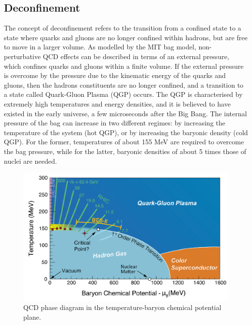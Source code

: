 \subsection{Deconfinement}
The concept of deconfinement refers to the transition from a confined state to a state where quarks and gluons are no longer confined within hadrons, but are free to move in a larger volume. As modelled by the MIT bag model, non-perturbative QCD effects can be described in terms of an external pressure, which confines quarks and gluons within a finite volume. If the external pressure is overcome by the pressure due to the kinematic energy of the quarks and gluons, then the hadrons constituents are no longer confined, and a transition to a state called Quark-Gluon Plasma (QGP) occurs. The QGP is characterised by extremely high temperatures and energy densities, and it is believed to have existed in the early universe, a few microseconds after the Big Bang. The internal pressure of the bag can increase in two different regimes: by increasing the temperature of the system (hot QGP), or by increasing the baryonic density (cold QGP). For the former, temperatures of about 155 MeV are required to overcome the bag pressure, while for the latter, baryonic densities of about 5 times those of nuclei are needed. 
\begin{figure}
  \centering
  \includegraphics[width=0.7\linewidth]{Figures/Chapter 1/QCD-diagram.jpg}
  \caption{QCD phase diagram in the temperature-baryon chemical potential plane.}
  \label{fig:PhaseDiagram}
\end{figure}

